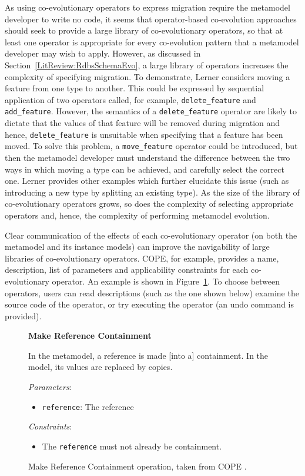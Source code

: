 As using co-evolutionary operators to express migration require the metamodel developer to write no code, it seems that operator-based co-evolution approaches should seek to provide a large library of co-evolutionary operators, so that at least one operator is appropriate for every co-evolution pattern that a metamodel developer may wish to apply. However, as discussed in Section~\ref{LitReview:RdbsSchemaEvo}, a large library of operators increases the complexity of specifying migration. To demonstrate, Lerner considers moving a feature from one type to another. This could be expressed by sequential application of two operators called, for example, \texttt{delete\_feature} and \texttt{add\_feature}. However, the semantics of a \texttt{delete\_feature} operator are likely to dictate that the  values of that feature will be removed during migration and hence, \texttt{delete\_feature} is unsuitable when specifying that a feature has been moved. To solve this problem, a \texttt{move\_feature} operator could be introduced, but then the metamodel developer must understand the difference between the two ways in which moving a type can be achieved, and carefully select the correct one. Lerner provides other examples which further elucidate this issue (such as introducing a new type by splitting an existing type). As the size of the library of co-evolutionary operators grows, so does the complexity of selecting appropriate operators and, hence, the complexity of performing metamodel evolution.

Clear communication of the effects of each co-evolutionary operator (on both the metamodel and its instance models) can improve the navigability of large libraries of co-evolutionary operators. COPE, for example, provides a name, description, list of parameters and applicability constraints for each co-evolutionary operator. An example is shown in Figure~\ref{fig:cope_op}. To choose between operators, users can read descriptions (such as the one shown below) examine the source code of the operator, or try executing the operator (an undo command is provided).


\begin{figure}[htbp]
	\begin{framed}
		\textbf{Make Reference Containment}

		In the metamodel, a reference is made [into a] containment. In the model, its values are replaced by copies.


		\emph{Parameters}:
		\begin{itemize}
			\item \texttt{reference}: The reference
		\end{itemize}

		\emph{Constraints}:
		\begin{itemize}
			\item The \texttt{reference} must not already be containment.
		\end{itemize}
	\end{framed}
	\caption[COPE's Make Reference Containment operation.]{Make Reference Containment operation, taken from COPE \cite{herrmannsdoerfer09cope}.}
\label{fig:cope_op}
\end{figure}

